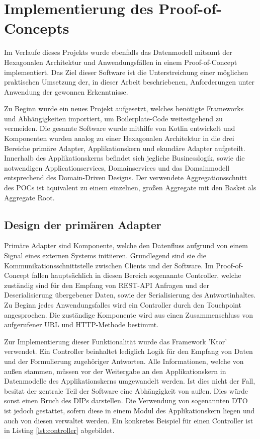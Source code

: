 \chapter{Implementierung des Proof-of-Concepts}

Im Verlaufe dieses Projekts wurde ebenfalls das Datenmodell mitsamt der Hexagonalen Architektur und Anwendungsfällen in einem Proof-of-Concept implementiert. Das Ziel dieser Software ist die Unterstreichung einer möglichen praktischen Umsetzung der, in dieser Arbeit beschriebenen, Anforderungen unter Anwendung der gewonnen Erkenntnisse. 

Zu Beginn wurde ein neues Projekt aufgesetzt, welches benötigte Frameworks und Abhängigkeiten importiert, um Boilerplate-Code weitestgehend zu vermeiden. Die gesamte Software wurde mithilfe von Kotlin entwickelt und Komponenten wurden analog zu einer Hexagonalen Architektur in die drei Bereiche primäre Adapter, Applikationskern und ekundäre Adapter aufgeteilt. Innerhalb des Applikationskerns befindet sich jegliche Businesslogik, sowie die notwendigen Applicationservices, Domainservices und das Domainmodell entsprechend des Domain-Driven Designs. Der verwendete Aggregationsschnitt des POCs ist äquivalent zu einem einzelnen, großen Aggregate mit den Basket als Aggregate Root.


\section{Design der primären Adapter}

Primäre Adapter sind Komponente, welche den Datenfluss aufgrund von einem Signal eines externen Systems initiieren. Grundlegend sind sie die Kommunikationsschnittstelle zwischen Clients und der Software. Im Proof-of-Concept fallen hauptsächlich in diesen Bereich sogenannte Controller, welche zuständig sind für den Empfang von REST-API Anfragen und der Deserialisierung übergebener Daten, sowie der Serialisierung des Antwortinhaltes. Zu Beginn jedes Anwendungsfalles wird ein Controller durch den Touchpoint angesprochen. Die zuständige Komponente wird aus einen Zusammenschluss von aufgerufener URL und HTTP-Methode bestimmt. 

Zur Implementierung dieser Funktionalität wurde das Framework 'Ktor' verwendet. Ein Controller beinhaltet lediglich Logik für den Empfang von Daten und der Formulierung zugehöriger Antworten. Alle Informationen, welche von außen stammen, müssen vor der Weitergabe an den Applikationskern in Datenmodelle des Applikationskerns umgewandelt werden. Ist dies nicht der Fall, besitzt der zentrale Teil der Software eine Abhängigkeit von außen. Dies würde sonst einen Bruch des \acrlong{DIP}s darstellen. Die Verwendung von sogenannten \acrfull{DTO} ist jedoch gestattet, sofern diese in einem Modul des Applikationskern liegen und auch von diesen verwaltet werden. Ein konkretes Beispiel für einen Controller ist in Listing \ref{lst:controller} abgebildet.

